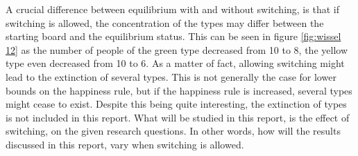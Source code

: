 A crucial difference between equilibrium with and without switching, is that if switching is allowed, the concentration of the types may differ between the starting board and the equilibrium status. 
This can be seen in figure \ref{fig:wissel 12} as the number of people of the green type decreased from 10 to 8, the yellow type even decreased from 10 to 6. 
As a matter of fact, allowing switching might lead to the extinction of several types. 
This is not generally the case for lower bounds on the happiness rule, but if the happiness rule is increased, several types might cease to exist. Despite this being quite interesting, the extinction of types is not included in this report. What will be studied in this report, is the effect of switching, on the given research questions. In other words, how will the results discussed in this report, vary when switching is allowed. 
\newpage

